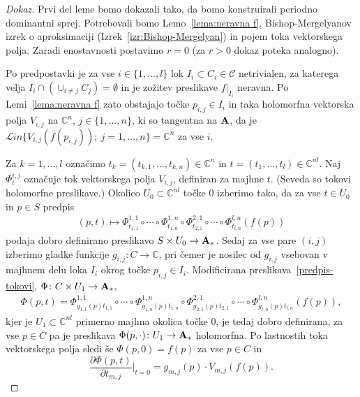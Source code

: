 \documentclass[12pt,a4paper,twoside]{article}
\theoremstyle{definition} %
\newenvironment{dokaz}[1][Dokaz]{\begin{proof}[#1]}{\end{proof}}
\theoremstyle{plain} %
\numberwithin{equation}{section}  %
\newcommand{\C}{\mathbb C}
\begin{document}
\begin{dokaz}
Prvi del leme bomo dokazali tako, da bomo konstruirali periodno dominantni sprej. Potrebovali bomo Lemo~\ref{lema:neravna f}, Bishop-Mergelyanov izrek o aproksimaciji (Izrek~\ref{izr:Bishop-Mergelyan}) in pojem toka vektorskega polja.
Zaradi enostavnosti postavimo $r=0$ (za $r>0$ dokaz poteka analogno).

Po predpostavki je za vse $i \in \{ 1, \dots, l \}$ lok $I_{i} \subset C_{i} \in \mathcal{C}$ netrivialen, za katerega velja $I_{i} \cap (\cup_{i \neq j} C_{j}) = \emptyset$ in je zožitev preslikave $f|_{I_{i}}$ neravna. Po Lemi~\ref{lema:neravna f} zato obstajajo točke $p_{i,j} \in I_{i}$ in taka holomorfna vektorska polja $V_{i,j}$ na $\C^{n}$, $j \in \{1, \dots, n \}$, ki so tangentna na $\textbf{\textup{A}}$, da je $\mathcal{L}in \{ V_{i,j}(f(p_{i,j})) ; \ j = 1, \dots, n \} = \C^{n}$ za vse $i$.

Za $k = 1, \dots , l$ označimo $t_{k} = (t_{k,1}, \dots, t_{k,n}) \in \C^{n}$ in $t = (t_{1}, \dots, t_{l}) \in \C^{nl}$. Naj $\Phi_{t}^{i,j}$ označuje tok vektorskega polja $V_{i,j}$, definiran za majhne $t$. (Seveda so tokovi holomorfne preslikave.)
Okolico $U_{0} \subset \C^{nl}$ točke $0$ izberimo tako, da za vse $t \in U_{0}$ in $p \in S$ predpis
\begin{gather} \label{predpis-tokovi}
(p, t) \mapsto \Phi_{t_{1,1}}^{1,1} \circ \cdots \circ \Phi_{t_{1,n}}^{1,n} \circ \Phi_{t_{2,1}}^{2,1} \circ \cdots \circ \Phi_{t_{l,n}}^{l,n} (f(p))
\end{gather}
podaja dobro definirano preslikavo $S \times U_{0} \to \textbf{\textup{A}}_{*}$.
Sedaj za vse pare $(i,j)$ izberimo gladke funkcije $g_{i,j} \colon C \to \C$, pri čemer je nosilec od $g_{i,j}$ vsebovan v majhnem delu loka $I_{i}$ okrog točke $p_{i,j} \in I_{i}$.
Modificirana preslikava~\eqref{predpis-tokovi}, $\Phi \colon C \times U_{1} \to \textbf{\textup{A}}_{*}$,
\begin{gather} \label{predpis-Phi}
\Phi(p,t) = \Phi_{g_{1,1}(p)t_{1,1}}^{1,1} \circ \cdots \circ \Phi_{g_{1,n}(p)t_{1,n}}^{1,n} \circ \Phi_{g_{2,1}(p)t_{2,1}}^{2,1} \circ \cdots \circ \Phi_{g_{l,n}(p)t_{l,n}}^{l,n} (f(p)),
\end{gather}
kjer je $U_{1} \subset \C^{nl}$ primerno majhna okolica točke $0$, je tedaj dobro definirana, za vse $p \in C$ pa je preslikava $\Phi(p, \cdot) \colon U_{1} \to \textbf{\textup{A}}_{*}$ holomorfna. Po lastnostih toka vektorskega polja sledi še $\Phi(p,0) = f(p)$ za vse $p \in C$ in
\begin{equation} \label{dPhi/dt}
\frac{\partial \Phi(p,t)}{\partial t_{m,j}} \Big|_{t=0} = g_{m,j}(p) \cdot V_{m,j}(f(p)).
\end{equation}


\end{dokaz}
\end{document}
